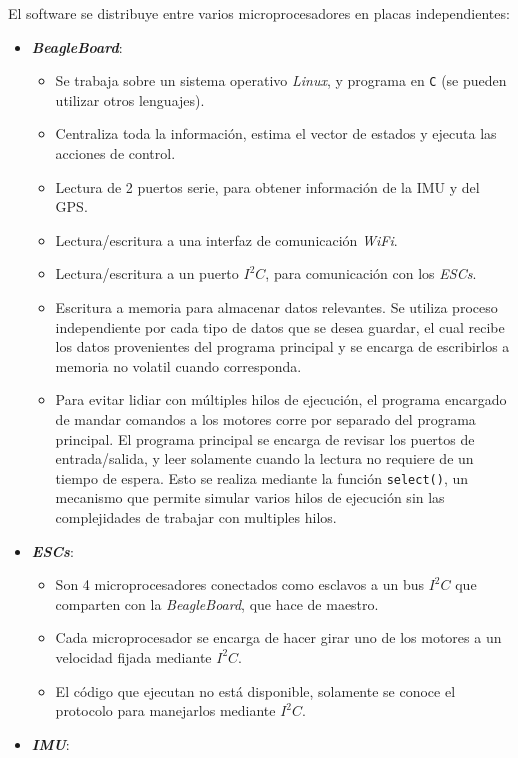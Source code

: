 \documentclass[main]{subfiles}
\begin{document}
El software se distribuye entre varios microprocesadores en placas independientes:
\begin{itemize}
\item \textbf{\textit{BeagleBoard}}:
  \begin{itemize}
  \item Se trabaja sobre un sistema operativo \textit{Linux}, y programa en \verb+C+ (se pueden utilizar otros lenguajes).
  \item Centraliza toda la informaci\'on, estima el vector de estados y ejecuta las acciones de control.
  \item Lectura de 2 puertos serie, para obtener informaci\'on de la IMU y del GPS.
  \item Lectura/escritura a una interfaz de comunicaci\'on \textit{WiFi}.
  \item Lectura/escritura a un puerto $I^2C$, para comunicaci\'on con los \textit{ESCs}.
  \item Escritura a memoria para almacenar datos relevantes. Se utiliza proceso independiente por cada tipo de datos que se desea guardar, el cual recibe los datos provenientes del programa principal y se encarga de escribirlos a memoria no volatil cuando corresponda.
  \item Para evitar lidiar con m\'ultiples hilos de ejecuci\'on, el programa encargado de mandar comandos a los motores corre por separado del programa principal. El programa principal se encarga de revisar los puertos de entrada/salida, y leer solamente cuando la lectura no requiere de un tiempo de espera. Esto se realiza mediante la funci\'on \verb+select()+, un mecanismo que permite simular varios hilos de ejecuci\'on sin las complejidades de trabajar con multiples hilos.
  \end{itemize}
\item \textbf{\textit{ESCs}}:
  \begin{itemize}
  \item Son 4 microprocesadores conectados como esclavos a un bus $I^2C$ que comparten con la \textit{BeagleBoard}, que hace de maestro.
  \item Cada microprocesador se encarga de hacer girar uno de los motores a un velocidad fijada mediante $I^2C$.
  \item El c\'odigo que ejecutan no est\'a disponible, solamente se conoce el protocolo para manejarlos mediante $I^2C$.
  \end{itemize}
\item \textbf{\textit{IMU}}:
  \begin{itemize}

\end{itemize}
\end{itemize}
\end{document}
